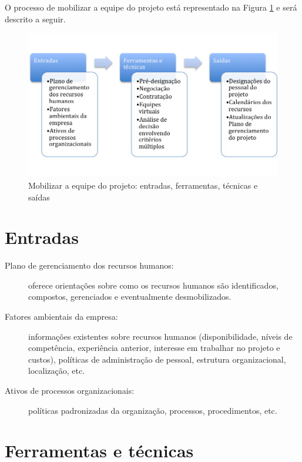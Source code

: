 O processo de mobilizar a equipe do projeto está representado na Figura \ref{fig:rh:mob:efts} e será descrito a seguir.

\begin{figure}[!h]
	\centering
	\includegraphics[scale=0.5]{Figuras/rh_efts_mobilizar.png}
	\caption{Mobilizar a equipe do projeto: entradas, ferramentas, técnicas e saídas}
	\label{fig:rh:mob:efts}
\end{figure}

\section{Entradas}

\begin{description}

	\item[Plano de gerenciamento dos recursos humanos:] oferece orientações sobre como os recursos humanos são identificados, compostos, gerenciados e eventualmente desmobilizados.
	
	\item[Fatores ambientais da empresa:] informações existentes sobre recursos humanos (disponibilidade, níveis de competência, experiência anterior, interesse em trabalhar no projeto e custos), políticas de administração de pessoal, estrutura organizacional, localização, etc.
	
	\item[Ativos de processos organizacionais:] políticas padronizadas da organização, processos, procedimentos, etc.
	
\end{description}

\section{Ferramentas e técnicas}

